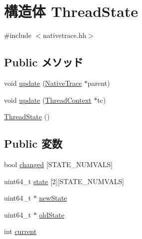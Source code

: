 \hypertarget{structTrace_1_1ArmNativeTrace_1_1ThreadState}{
\section{構造体 ThreadState}
\label{structTrace_1_1ArmNativeTrace_1_1ThreadState}
}


{\ttfamily \#include $<$nativetrace.hh$>$}\subsection*{Public メソッド}
\begin{DoxyCompactItemize}
\item 
void \hyperlink{structTrace_1_1ArmNativeTrace_1_1ThreadState_a85ec503b4f5d7eeddd8cda17abf92e24}{update} (\hyperlink{classTrace_1_1NativeTrace}{NativeTrace} $\ast$parent)
\item 
void \hyperlink{structTrace_1_1ArmNativeTrace_1_1ThreadState_ace3d3d91c61ce60aa033e666444d2301}{update} (\hyperlink{classThreadContext}{ThreadContext} $\ast$tc)
\item 
\hyperlink{structTrace_1_1ArmNativeTrace_1_1ThreadState_ae7173394d697db6556eb202777688063}{ThreadState} ()
\end{DoxyCompactItemize}
\subsection*{Public 変数}
\begin{DoxyCompactItemize}
\item 
bool \hyperlink{structTrace_1_1ArmNativeTrace_1_1ThreadState_a6f3ddd660306f0af023be3dd6f59b3e8}{changed} \mbox{[}STATE\_\-NUMVALS\mbox{]}
\item 
uint64\_\-t \hyperlink{structTrace_1_1ArmNativeTrace_1_1ThreadState_ad15783a90caf5a0b3cda1f7eec3e9351}{state} \mbox{[}2\mbox{]}\mbox{[}STATE\_\-NUMVALS\mbox{]}
\item 
uint64\_\-t $\ast$ \hyperlink{structTrace_1_1ArmNativeTrace_1_1ThreadState_a64ef97177e1f16a7092ec9e357632722}{newState}
\item 
uint64\_\-t $\ast$ \hyperlink{structTrace_1_1ArmNativeTrace_1_1ThreadState_a8e4b1b6cea994cadfac0ff9b33148ed9}{oldState}
\item 
int \hyperlink{structTrace_1_1ArmNativeTrace_1_1ThreadState_ab04e2d55ea4a544f3575812582af7b51}{current}
\end{DoxyCompactItemize}


